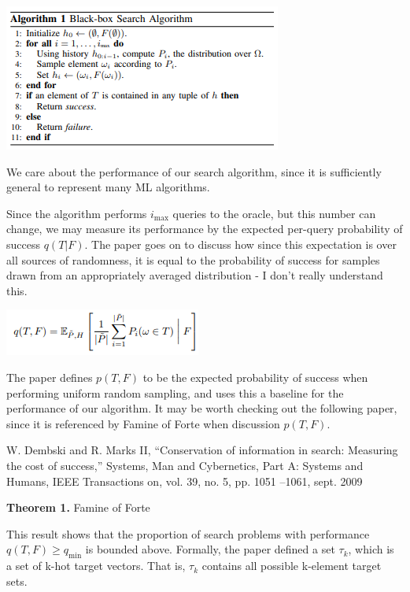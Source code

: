\documentclass[12pt]{article}
\begin{document}
\begin{center}
    \includegraphics{FamineForte/BlackBoxAlgo.PNG}
\end{center}

We care about the performance of our search algorithm, since it is sufficiently general to represent many ML algorithms. 

Since the algorithm performs $i_{\text{max}}$ queries to the oracle, but this number can change, we may measure its performance by the expected per-query probability of success $q(T|F)$. The paper goes on to discuss how since this expectation is over all sources of randomness, it is equal to the probability of success for samples drawn from an appropriately averaged distribution - I don't really understand this. 

\begin{center}
    \includegraphics{FamineForte/ExpectedSuccess.PNG}
\end{center}

The paper defines $p(T,F)$ to be the expected probability of success when performing uniform random sampling, and uses this a baseline for the performance of our algorithm. It may be worth checking out the following paper, since it is referenced by Famine of Forte when discussion $p(T,F)$. 


W. Dembski and R. Marks II, “Conservation of information in search:
Measuring the cost of success,” Systems, Man and Cybernetics, Part A:
Systems and Humans, IEEE Transactions on, vol. 39, no. 5, pp. 1051
–1061, sept. 2009

\textbf{Theorem 1.} Famine of Forte

This result shows that the proportion of search problems with performance $q(T,F) \geq q_{\text{min}}$ is bounded above. Formally, the paper defined a set $\tau_k$, which is a set of k-hot target vectors. That is, $\tau_k$ contains all possible k-element target sets. 
\end{document}
